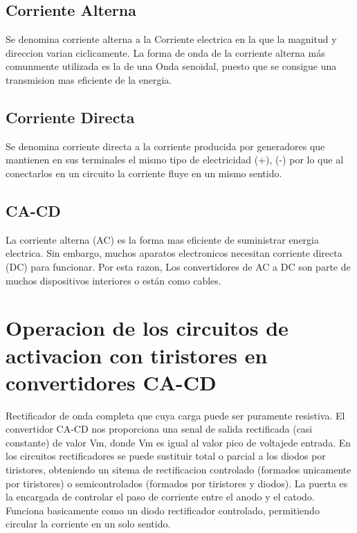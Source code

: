 \documentclass[12pt,a4paper]{article}
\begin{document}
\subsection{Corriente Alterna}
Se denomina corriente alterna a la Corriente electrica en la que la magnitud y direccion varian ciclicamente. La forma de onda de la corriente alterna más comunmente utilizada es la de una Onda senoidal, puesto que se consigue una transmision mas eficiente de la energia.
\subsection{Corriente Directa}
Se denomina corriente directa  a la corriente producida por generadores que mantienen en sus terminales el mismo tipo de electricidad (+), (-) por lo que al conectarlos en un circuito la corriente fluye en un mismo sentido.
\subsection{CA-CD}
La corriente alterna (AC) es la forma mas eficiente de suministrar energia electrica. Sin embargo, muchos aparatos electronicos necesitan corriente directa (DC) para funcionar. Por esta razon, Los convertidores de AC a DC son parte de muchos dispositivos interiores o están como cables.
\newpage
\section{Operacion de los circuitos de activacion con tiristores en convertidores CA-CD}
Rectificador de onda completa que cuya carga puede ser puramente resistiva.
El convertidor CA-CD nos proporciona una senal de salida rectificada (casi constante) de valor Vm, donde Vm es igual al valor pico de voltajede entrada.
En los circuitos rectificadores se puede sustituir total o parcial a los diodos por tiristores, obteniendo un sitema de rectificacion controlado (formados unicamente por tiristores) o semicontrolados (formados por tiristores y diodos).
La puerta es la encargada de controlar el paso de corriente entre el anodo y el catodo. Funciona basicamente como un diodo rectificador controlado, permitiendo circular la corriente en un solo sentido.
\end{document}
